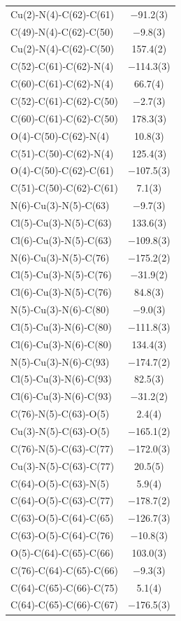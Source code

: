 \begin{center}
{\begin{supertabular}{p{1.8in}c}
Cu(2)-N(4)-C(62)-C(61)&$-$91.2(3)\\
C(49)-N(4)-C(62)-C(50)&$-$9.8(3)\\
Cu(2)-N(4)-C(62)-C(50)&157.4(2)\\
C(52)-C(61)-C(62)-N(4)&$-$114.3(3)\\
C(60)-C(61)-C(62)-N(4)&66.7(4)\\
C(52)-C(61)-C(62)-C(50)&$-$2.7(3)\\
C(60)-C(61)-C(62)-C(50)&178.3(3)\\
O(4)-C(50)-C(62)-N(4)&10.8(3)\\
C(51)-C(50)-C(62)-N(4)&125.4(3)\\
O(4)-C(50)-C(62)-C(61)&$-$107.5(3)\\
C(51)-C(50)-C(62)-C(61)&7.1(3)\\
N(6)-Cu(3)-N(5)-C(63)&$-$9.7(3)\\
Cl(5)-Cu(3)-N(5)-C(63)&133.6(3)\\
Cl(6)-Cu(3)-N(5)-C(63)&$-$109.8(3)\\
N(6)-Cu(3)-N(5)-C(76)&$-$175.2(2)\\
Cl(5)-Cu(3)-N(5)-C(76)&$-$31.9(2)\\
Cl(6)-Cu(3)-N(5)-C(76)&84.8(3)\\
N(5)-Cu(3)-N(6)-C(80)&$-$9.0(3)\\
Cl(5)-Cu(3)-N(6)-C(80)&$-$111.8(3)\\
Cl(6)-Cu(3)-N(6)-C(80)&134.4(3)\\
N(5)-Cu(3)-N(6)-C(93)&$-$174.7(2)\\
Cl(5)-Cu(3)-N(6)-C(93)&82.5(3)\\
Cl(6)-Cu(3)-N(6)-C(93)&$-$31.2(2)\\
C(76)-N(5)-C(63)-O(5)&2.4(4)\\
Cu(3)-N(5)-C(63)-O(5)&$-$165.1(2)\\
C(76)-N(5)-C(63)-C(77)&$-$172.0(3)\\
Cu(3)-N(5)-C(63)-C(77)&20.5(5)\\
C(64)-O(5)-C(63)-N(5)&5.9(4)\\
C(64)-O(5)-C(63)-C(77)&$-$178.7(2)\\
C(63)-O(5)-C(64)-C(65)&$-$126.7(3)\\
C(63)-O(5)-C(64)-C(76)&$-$10.8(3)\\
O(5)-C(64)-C(65)-C(66)&103.0(3)\\
C(76)-C(64)-C(65)-C(66)&$-$9.3(3)\\
C(64)-C(65)-C(66)-C(75)&5.1(4)\\
C(64)-C(65)-C(66)-C(67)&$-$176.5(3)\\

\end{supertabular}}
\end{center}
